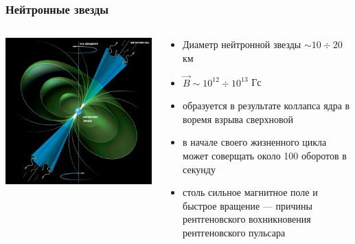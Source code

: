 \documentclass[10pt, pdf, hyperref={unicode}]{beamer}
\begin{document}
	\begin{frame}
  	
		\frametitle{Нейтронные звезды}
  	
  		\begin{columns}[T]

  			\begin{column}{0.5\textwidth}
  				\includegraphics[width=\textwidth]{neutron_star}
  			\end{column}
  	
  			\begin{column}{0.5\textwidth}
  		  		\begin{itemize}
  		  			\item Диаметр нейтронной звезды $\sim 10 \div 20$ км
  		  			\item $\overrightarrow{B} \sim 10^{12} \div 10^{13}$ Гс
  		  			\item образуется в результате коллапса ядра в воремя взрыва сверхновой
  		  			\item в начале своего жизненного цикла может соверщать около 100 оборотов в секунду
  		  			\item столь сильное магнитное поле и быстрое вращение --- причины рентгеновского вохникновения рентгеновского пульсара
  		  		\end{itemize}
  			\end{column}
		\end{columns}
  	
	\end{frame}
  
\end{document}
